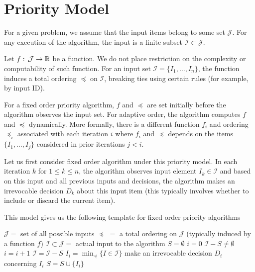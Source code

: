 \section{Priority Model}

For a given problem, we assume that the input items belong to some set $\mathcal{J}$. For any execution of the algorithm, the input is a finite subset $\mathcal{I} \subset \mathcal{J}$.

Let $f:\,\mathcal{J} \to \mathbb{R}$ be a function. We do not place restriction on the complexity or computability of such function. For an input set $\mathcal{I} = \{I_1,\ldots,I_n\}$, the function induces a total ordering $\preceq$ on $\mathcal{I}$, breaking ties using certain rules (for example, by input ID).

For a fixed order priority algorithm, $f$ and $\preceq$ are set initially before the algorithm observes the input set. For adaptive order, the algorithm computes $f$ and $\preceq$ dynamically. More formally, there is a different function $f_i$ and ordering $\preceq_i$ associated with each iteration $i$ where $f_i$ and $\preceq$ depends on the items $\{I_1,\ldots,I_{j}\}$ considered in prior iterations $j < i$. 

Let us first consider fixed order algorithm under this priority model. In each iteration $k$ for $1 \leq k \leq n$, the algorithm observes input element $I_k \in \mathcal{I}$ and based on this input and all previous inputs and decisions, the algorithm makes an irrevocable decision $D_k$ about this input item (this typically involves whether to include or discard the current item).

This model gives us the following template for fixed order priority algorithms

\begin{codebox}
    \li $\mathcal{J} =$ set of all possible inputs
    \li $\preceq\,\, = $ a total ordering on $\mathcal{J}$ (typically induced by a function $f$)
    \li $\mathcal{I} \subset \mathcal{J} = $ actual input to the algorithm
    \li $S = \emptyset$ 
    \li $i = 0$
    \li \While $\mathcal{I} - S \neq \emptyset$ \Do
        \li $i = i + 1$
        \li $\mathcal{I} = \mathcal{I} - S$
        \li $I_i = \min_{\preceq} \{ I \in \mathcal{I} \}$ 
        \li make an irrevocable decision $D_i$ concerning $I_i$ 
        \li $S = S \cup \{I_i\}$
    \End      
\end{codebox}

